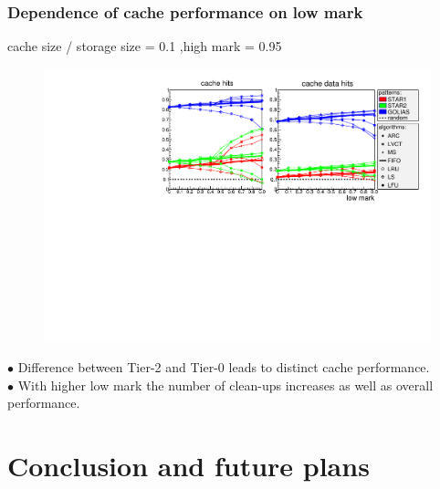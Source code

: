 \documentclass{beamer}
\begin{document}
\begin{frame}\frametitle{Dependence of cache performance on low mark}
\vspace{-0.4cm}
\begin{tiny}	cache size / storage size = 0.1 ,high mark = 0.95 \end{tiny}
\begin{figure}
\vspace{-0.4cm}
	\begin{center}
		\centering
		\includegraphics[width=\textwidth]{pic/low-basic_color.pdf}
	\end{center}
\end{figure}	
\vspace{-0.5cm}
$\bullet $ Difference between Tier-2 and Tier-0 leads to distinct cache performance.\\
$\bullet $ With higher low mark the number of clean-ups increases as well as overall performance.\\


\end{frame}

\section{Conclusion and future plans}
\end{document}

